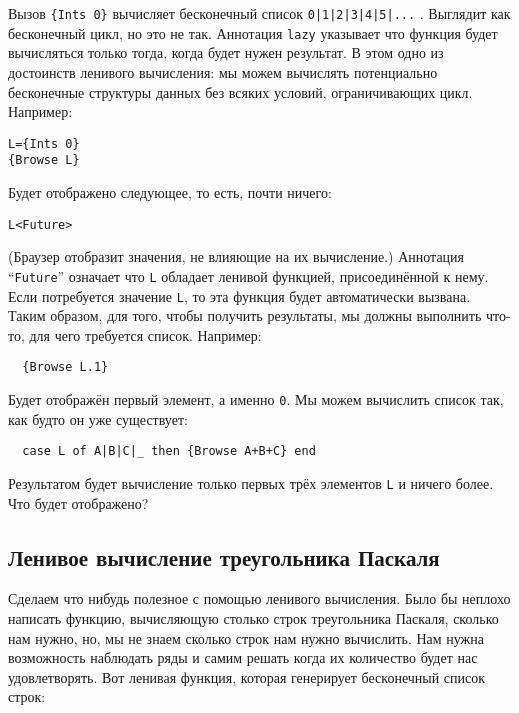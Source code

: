 Вызов \lstinline|{Ints 0}| вычисляет бесконечный список \lstinline!0|1|2|3|4|5|...! . Выглядит как бесконечный цикл, но это не так. Аннотация \lstinline|lazy| указывает что функция будет вычисляться только тогда, когда будет нужен результат. В этом одно из достоинств ленивого вычисления: мы можем вычислять потенциально бесконечные структуры данных без всяких условий, ограничивающих цикл. Например:

\begin{lstlisting}
L={Ints 0}
{Browse L}
\end{lstlisting}


Будет отображено следующее, то есть, почти ничего:

\begin{lstlisting}
L<Future>
\end{lstlisting}

(Браузер отобразит значения, не влияющие на их вычисление.) Аннотация ``\lstinline|Future|'' означает что \lstinline|L| обладает ленивой функцией, присоединённой к нему. Если потребуется значение \lstinline|L|, то эта функция будет автоматически вызвана. Таким образом, для того, чтобы получить результаты, мы должны выполнить что-то, для чего требуется список. Например:

\begin{lstlisting}
  {Browse L.1}
\end{lstlisting}

Будет отображён первый элемент, а именно \lstinline|0|. Мы можем вычислить список так, как будто он уже существует:

\begin{lstlisting}
  case L of A|B|C|_ then {Browse A+B+C} end
\end{lstlisting}

Результатом будет вычисление только первых трёх элементов \lstinline|L| и ничего более. Что будет отображено?

\subsection{Ленивое вычисление треугольника Паскаля}

Сделаем что нибудь полезное с помощью ленивого вычисления. Было бы неплохо написать функцию, вычисляющую столько строк треугольника Паскаля, сколько нам нужно, но, мы не знаем сколько строк нам нужно вычислить. Нам нужна возможность наблюдать ряды и самим решать когда их количество будет нас удовлетворять. Вот ленивая функция, которая генерирует бесконечный список строк:

